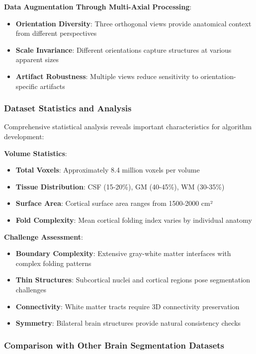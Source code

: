 \documentclass[12pt,a4paper]{article}
\begin{document}
\textbf{Data Augmentation Through Multi-Axial Processing}:
\begin{itemize}
    \item \textbf{Orientation Diversity}: Three orthogonal views provide anatomical context from different perspectives
    \item \textbf{Scale Invariance}: Different orientations capture structures at various apparent sizes
    \item \textbf{Artifact Robustness}: Multiple views reduce sensitivity to orientation-specific artifacts
\end{itemize}

\subsubsection{Dataset Statistics and Analysis}

Comprehensive statistical analysis reveals important characteristics for algorithm development:

\textbf{Volume Statistics}:
\begin{itemize}
    \item \textbf{Total Voxels}: Approximately 8.4 million voxels per volume
    \item \textbf{Tissue Distribution}: CSF (15-20\%), GM (40-45\%), WM (30-35\%)
    \item \textbf{Surface Area}: Cortical surface area ranges from 1500-2000 cm²
    \item \textbf{Fold Complexity}: Mean cortical folding index varies by individual anatomy
\end{itemize}

\textbf{Challenge Assessment}:
\begin{itemize}
    \item \textbf{Boundary Complexity}: Extensive gray-white matter interfaces with complex folding patterns
    \item \textbf{Thin Structures}: Subcortical nuclei and cortical regions pose segmentation challenges
    \item \textbf{Connectivity}: White matter tracts require 3D connectivity preservation
    \item \textbf{Symmetry}: Bilateral brain structures provide natural consistency checks
\end{itemize}

\subsubsection{Comparison with Other Brain Segmentation Datasets}
\end{document}
